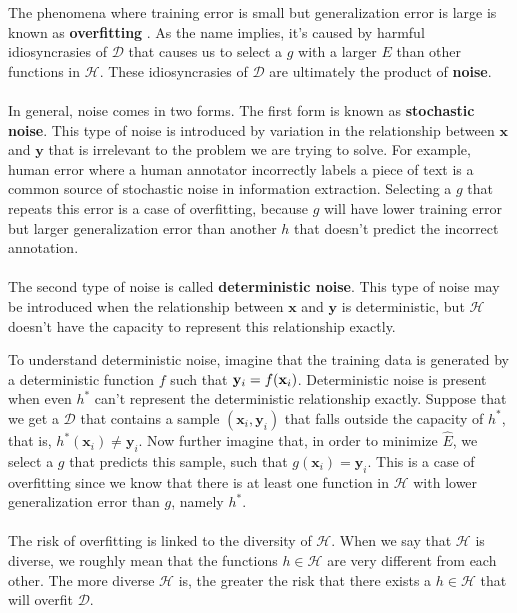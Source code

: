 The phenomena where training error is small but generalization error is large is known as \textbf{overfitting} \citep{yaser12}. As the name implies, it's caused by harmful idiosyncrasies of $\mathcal{D}$ that causes us to select a $g$ with a larger $E$ than other functions in $\mathcal{H}$. These idiosyncrasies of $\mathcal{D}$ are ultimately the product of \textbf{noise}.
\\\\
In general, noise comes in two forms. The first form is known as \textbf{stochastic noise}. This type of noise is introduced by variation in the relationship between $\mathbf{x}$ and $\mathbf{y}$ that is irrelevant to the problem we are trying to solve. For example, human error where a human annotator incorrectly labels a piece of text is a common source of stochastic noise in information extraction. Selecting a $g$ that repeats this error is a case of overfitting, because $g$ will have lower training error but larger generalization error than another $h$ that doesn't predict the incorrect annotation.
\\\\
The second type of noise is called \textbf{deterministic noise}. This type of noise may be introduced when the relationship between $\mathbf{x}$ and $\mathbf{y}$ is deterministic, but $\mathcal{H}$ doesn't have the capacity to represent this relationship exactly.

To understand deterministic noise, imagine that the training data is generated by a deterministic function $f$ such that $\mathbf{y}_i = f(\mathbf{x}_i)$. Deterministic noise is present when even $h^*$ can't represent the deterministic relationship exactly. Suppose that we get a $\mathcal{D}$ that contains a sample $(\mathbf{x}_i, \mathbf{y}_i)$ that falls outside the capacity of $h^*$, that is, $h^*(\mathbf{x}_i) \neq \mathbf{y}_i$. Now further imagine that, in order to minimize $\hat{E}$, we select a $g$ that predicts this sample, such that $g(\mathbf{x}_i) = \mathbf{y}_i$. This is a case of overfitting since we know that there is at least one function in $\mathcal{H}$ with lower generalization error than $g$, namely $h^*$.
\\\\
The risk of overfitting is linked to the diversity of $\mathcal{H}$. When we say that $\mathcal{H}$ is diverse, we roughly mean that the functions $h \in \mathcal{H}$ are very different from each other. The more diverse $\mathcal{H}$ is, the greater the risk that there exists a $h \in \mathcal{H}$ that will overfit $\mathcal{D}$.

